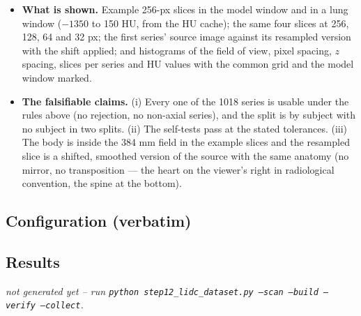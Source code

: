 \documentclass[11pt]{article}
\begin{document}
\begin{itemize}
        grids of 0.6 and 0.95 mm spacing, resamples to the same 64-px
        target: maximum difference between the two results 0.0023 HU away
        from the edge, 0.0035 HU against the analytic disc, area error
        $\leq 0.2\%$ --- the geometry is in millimetres, not in pixels.
        (b) $2 \times 2$ pooling preserves the mean exactly and the 8-bit
        window round-trips within 2.75 HU (half a grey level). (c) The
        selection of a synthetic 160-slice 0.625-mm series returns 40 slices
        with $\min \Delta z = 2.5$ mm and de-duplicates repeated positions.
        (d) On the built cache, the 8-bit slices equal the windowed
        \texttt{uint16} HU slices within one grey level, and the 64-px cache
        equals the pooled 256-px HU slices within one grey level.
  \item \textbf{What is shown.} Example 256-px slices in the model window
        and in a lung window ($-1350$ to 150 HU, from the HU cache); the same
        four slices at 256, 128, 64 and 32 px; the first series' source
        image against its resampled version with the shift applied; and
        histograms of the field of view, pixel spacing, $z$ spacing, slices
        per series and HU values with the common grid and the model window
        marked.
  \item \textbf{The falsifiable claims.} (i) Every one of the 1018 series
        is usable under the rules above (no rejection, no non-axial
        series), and the split is by subject with no subject in two splits.
        (ii) The self-tests pass at the stated tolerances. (iii) The
        body is inside the 384 mm field in the example slices and the
        resampled slice is a shifted, smoothed version of the source with
        the same anatomy (no mirror, no transposition --- the heart on the
        viewer's right in radiological convention, the spine at the bottom).
\end{itemize}

\subsection{Configuration (verbatim)}
{\small}

\subsection{Results}
  {\emph{not generated yet -- run \texttt{python step12\_lidc\_dataset.py --scan --build --verify --collect}.}}
\end{document}
